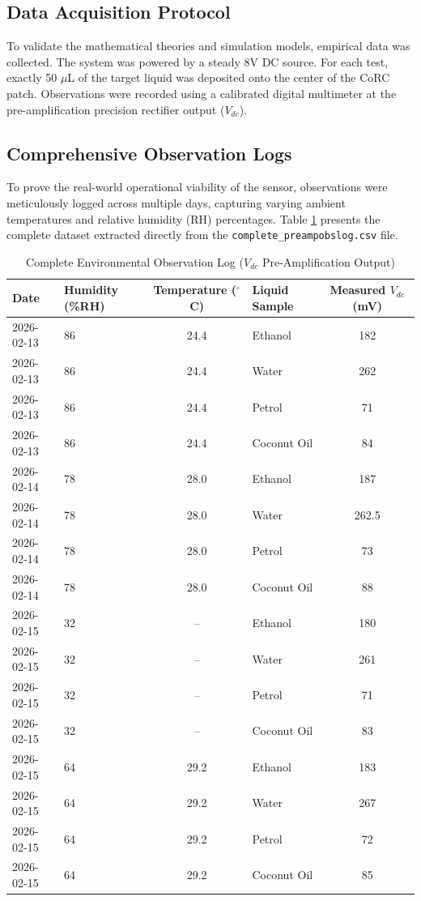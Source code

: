 \documentclass[11pt, a4paper]{article}
\begin{document}
\subsection{Data Acquisition Protocol}
To validate the mathematical theories and simulation models, empirical data was collected. The system was powered by a steady 8V DC source. For each test, exactly 50 $\mu$L of the target liquid was deposited onto the center of the CoRC patch. Observations were recorded using a calibrated digital multimeter at the pre-amplification precision rectifier output ($V_{dc}$). 

\subsection{Comprehensive Observation Logs}
To prove the real-world operational viability of the sensor, observations were meticulously logged across multiple days, capturing varying ambient temperatures and relative humidity (RH) percentages. Table \ref{tab:completelog} presents the complete dataset extracted directly from the \texttt{complete\_preampobslog.csv} file.

\begin{table}[H]
\centering
\caption{Complete Environmental Observation Log ($V_{dc}$ Pre-Amplification Output)}
\label{tab:completelog}
\begin{tabular}{|l|l|c|l|c|}
\hline
\textbf{Date} & \textbf{Humidity (\%RH)} & \textbf{Temperature ($^\circ$C)} & \textbf{Liquid Sample} & \textbf{Measured $V_{dc}$ (mV)} \\ \hline
2026-02-13 & 86 & 24.4 & Ethanol & 182 \\ \hline
2026-02-13 & 86 & 24.4 & Water & 262 \\ \hline
2026-02-13 & 86 & 24.4 & Petrol & 71 \\ \hline
2026-02-13 & 86 & 24.4 & Coconut Oil & 84 \\ \hline
2026-02-14 & 78 & 28.0 & Ethanol & 187 \\ \hline
2026-02-14 & 78 & 28.0 & Water & 262.5 \\ \hline
2026-02-14 & 78 & 28.0 & Petrol & 73 \\ \hline
2026-02-14 & 78 & 28.0 & Coconut Oil & 88 \\ \hline
2026-02-15 & 32 & -- & Ethanol & 180 \\ \hline
2026-02-15 & 32 & -- & Water & 261 \\ \hline
2026-02-15 & 32 & -- & Petrol & 71 \\ \hline
2026-02-15 & 32 & -- & Coconut Oil & 83 \\ \hline
2026-02-15 & 64 & 29.2 & Ethanol & 183 \\ \hline
2026-02-15 & 64 & 29.2 & Water & 267 \\ \hline
2026-02-15 & 64 & 29.2 & Petrol & 72 \\ \hline
2026-02-15 & 64 & 29.2 & Coconut Oil & 85 \\ \hline
\end{tabular}
\end{table}
\end{document}
